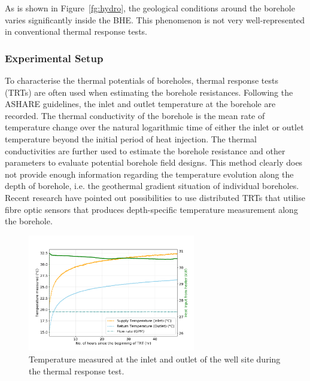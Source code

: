 	As is shown in Figure~\ref{fg:hydro}, the geological conditions around the borehole varies significantly inside the BHE. This phenomenon is not very well-represented in conventional thermal response tests.
	
\subsubsection{Experimental Setup}
	To characterise the thermal potentials of boreholes, thermal response tests (TRTs) are often used when estimating the borehole resistances. Following the ASHARE guidelines, the inlet and outlet temperature at the borehole are recorded. The thermal conductivity of the borehole is the mean rate of temperature change over the natural logarithmic time of either the inlet or outlet temperature beyond the initial period of heat injection. The thermal conductivities are further used to estimate the borehole resistance and other parameters to evaluate potential borehole field designs. This method clearly does not provide enough information regarding the temperature evolution along the depth of borehole, i.e. the geothermal gradient situation of individual boreholes. Recent research have pointed out possibilities to use distributed TRTs that utilise fibre optic sensors that produces depth-specific temperature measurement along the borehole.  
	
	\begin{figure}[h!]
	\centering
	\includegraphics[width=0.65\textwidth]{data/TRT_SI}	
	\caption{Temperature measured at the inlet and outlet of the well site during the thermal response test.}\label{fg:raw}
	\end{figure}
	
